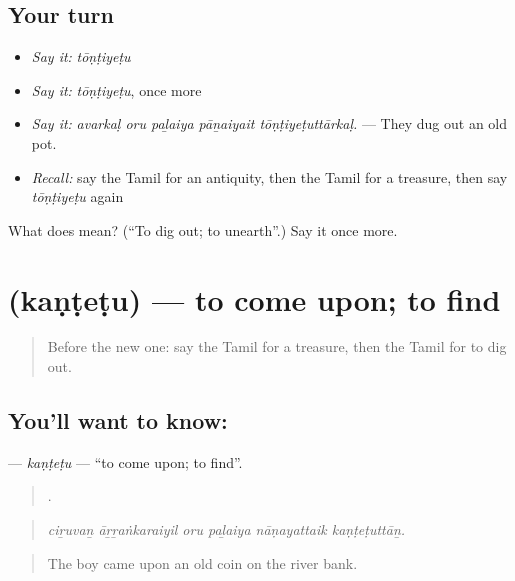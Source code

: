 \subsection*{Your turn}
\begin{itemize}
\raggedright
  \item \emph{Say it:} \emph{tōṇṭiyeṭu}
  \item \emph{Say it:} \emph{tōṇṭiyeṭu}, once more
  \item \emph{Say it:} \emph{avarkaḷ oru paḻaiya pāṉaiyait tōṇṭiyeṭuttārkaḷ.} — They dug out an old pot.
  \item \emph{Recall:} say the Tamil for an antiquity, then the Tamil for a treasure, then say \emph{tōṇṭiyeṭu} again
\end{itemize}

\begin{tcolorbox}[breakable,colback=teal!4,colframe=teal!35!black,title={Before you move on}]
What does  mean? (\textquotedblleft{}To dig out; to unearth\textquotedblright{}.) Say it once more.
\end{tcolorbox}
\section[\texorpdfstring{\ta{கண்டெடு} (kaṇṭeṭu)}{கண்டெடு (kaṇṭeṭu)}]{ (kaṇṭeṭu) — to come upon; to find}

\label{lesson:TA-C341-kantetu}



\begin{quote}
Before the new one: say the Tamil for a treasure, then the Tamil for to dig out.
\end{quote}

\subsection*{You'll want to know: }
\textbf{} — \emph{kaṇṭeṭu} — \textquotedblleft{}to come upon; to find\textquotedblright{}.

\begin{quote}
     .
\end{quote}

\begin{quote}
\emph{ciṟuvaṉ āṟṟaṅkaraiyil oru paḻaiya nāṇayattaik kaṇṭeṭuttāṉ.}
\end{quote}

\begin{quote}
The boy came upon an old coin on the river bank.
\end{quote}


